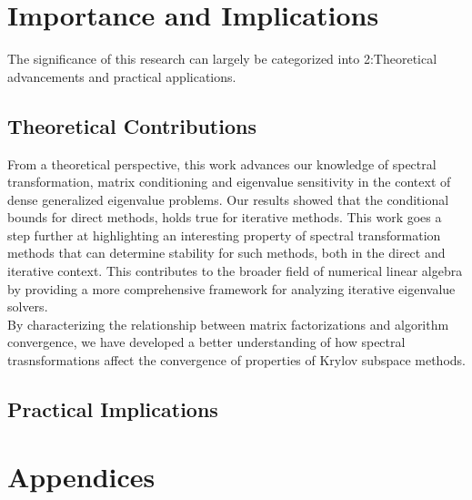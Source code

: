\documentclass[12pt,gsu,online,openany,singleside,hidelinks]{gsudiss}
\begin{document}
\section{Importance and Implications}
The significance of this research can largely be categorized into 2:Theoretical advancements and practical applications.

\subsection{Theoretical Contributions}
From a theoretical perspective, this work advances our knowledge of spectral transformation, matrix conditioning and eigenvalue sensitivity in the context of dense generalized eigenvalue problems. Our results showed that the conditional bounds for direct methods, holds true for iterative methods. This work goes a step further at highlighting an interesting property of spectral transformation methods that can determine stability for such methods, both in the direct and iterative context. This contributes to the broader field of numerical linear algebra by providing a more comprehensive framework for analyzing iterative eigenvalue solvers.\\

By characterizing the relationship between matrix factorizations and algorithm convergence, we have developed a better understanding of how spectral trasnsformations affect the convergence of properties of Krylov subspace methods.

\subsection{Practical Implications}

\appendix
\section*{Appendices}
\renewcommand{\thesubsection}{\Alph{subsection}}






\end{document}
